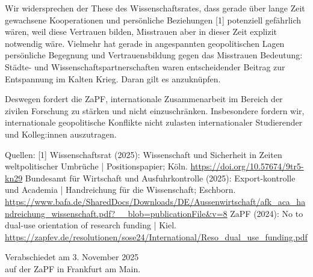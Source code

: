 \documentclass[DIV=calc]{scrartcl}
\let\oldgrqq=\grqq
\def\grqq{\oldgrqq\xspace}
\begin{document}
Wir widersprechen der These des Wissenschaftsrates, dass \glqq gerade über lange Zeit gewachsene Kooperationen und persönliche Beziehungen\grqq{} [1] potenziell gefährlich wären, weil diese Vertrauen bilden, Misstrauen aber in dieser Zeit explizit notwendig wäre. Vielmehr hat gerade in angespannten geopolitischen Lagen persönliche Begegnung und Vertrauensbildung gegen das Misstrauen Bedeutung: Städte- und Wissenschaftspartnerschaften waren entscheidender Beitrag zur Entspannung im Kalten Krieg. Daran gilt es anzuknüpfen.

Deswegen fordert die ZaPF, internationale Zusammenarbeit im Bereich der zivilen Forschung zu stärken und nicht einzuschränken. Insbesondere fordern wir, internationale geopolitische Konflikte nicht zulasten internationaler Studierender und Kolleg:innen auszutragen. 

Quellen:\newline
[1] Wissenschaftsrat (2025): Wissenschaft und Sicherheit in Zeiten weltpolitischer Umbrüche | Positionspapier; Köln. \url{https://doi.org/10.57674/9tr5-kn29} \newline
[2] Bundesamt für Wirtschaft und Ausfuhrkontrolle (2025): Export-kontrolle und
Academia | Handreichung für die Wissenschaft; Eschborn. \url{https://www.bafa.de/SharedDocs/Downloads/DE/Aussenwirtschaft/afk_aca_handreichung_wissenschaft.pdf?__blob=publicationFile&v=8} \newline 
[3] ZaPF (2024): No to dual-use orientation of research funding | Kiel. \url{https://zapfev.de/resolutionen/sose24/International/Reso_dual_use_funding.pdf}

%
\vfill
\begin{flushright}
	Verabschiedet am 3. November 2025 \\
	auf der ZaPF in Frankfurt am Main.
\end{flushright}
\end{document}

